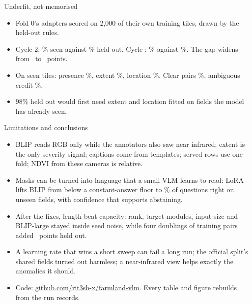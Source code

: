 \documentclass[aspectratio=169,10pt,t]{beamer}
\begin{document}
\begin{frame}{Underfit, not memorised}
\begin{itemize}
\item Fold 0's adapters scored on 2,000 of their own training tiles, drawn by the held-out rules.
\item Cycle 2: \fitTwoTrain\% seen against \fitTwoHeld\% held out. Cycle \finalCycle: \fitTrain\% against \fitHeld\%. The gap widens from \fitTwoGap\ to \fitGap\ points.
\item On seen tiles: presence \fitPresence\%, extent \fitExtent\%, location \fitLocation\%. Clear pairs \fitClear\%, ambiguous credit \fitAmbig\%.
\item 98\% held out would first need extent and location fitted on fields the model has already seen.
\end{itemize}
\end{frame}

\begin{frame}{Limitations and conclusions}
\begin{itemize}
\item BLIP reads RGB only while the annotators also saw near infrared; extent is the only severity signal; captions come from templates; served rows use one fold; NDVI from these cameras is relative.
\item Masks can be turned into language that a small VLM learns to read: LoRA lifts BLIP from below a constant-answer floor to \blipCorrMean\% of questions right on unseen fields, with confidence that supports abstaining.
\item After the fixes, length beat capacity: rank, target modules, input size and BLIP-large stayed inside seed noise, while four doublings of training pairs added \totalChange\ points held out.
\item A learning rate that wins a short sweep can fail a long run; the official split's shared fields turned out harmless; a near-infrared view helps exactly the anomalies it should.
\item Code: \url{github.com/rit3sh-x/farmland-vlm}. Every table and figure rebuilds from the run records.
\end{itemize}
\end{frame}
\end{document}
